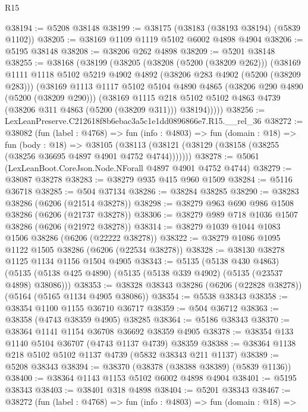 \begin{lexlean}{R15}
\begin{coremodule}
{{{{{{{{{{{@38194 := @5208 @38148
@38199 := @38175 (@38183 (@38193 @38194) (@5839 @1102))
@38205 := @38169 @1109 @1119 @5102 @6002 @4898 @4904
@38206 := @5195 @38148
@38208 := @38206 @262 @4898
@38209 := @5201 @38148
@38255 := @38168
    (@38199
      (@38205
        (@38208 (@5200 (@38209 @262)))
        (@38169
          @1111
          @1118
          @5102
          @5219
          @4902
          @4892
          (@38206 @283 @4902 (@5200 (@38209 @283)))
          (@38169
            @1113
            @1117
            @5102
            @5104
            @4890
            @4865
            (@38206 @290 @4890 (@5200 (@38209 @290)))
            (@38169
              @1115
              @218
              @5102
              @5102
              @4863
              @4739
              (@38206 @311 @4863 (@5200 (@38209 @311)))
              @38194)))))
@38256 := LexLeanPreserve.C212618f8b6ebac3a5c1e1dd0896866e7.R15.__rel_36
@38272 := @38082
    (fun (label : @4768) =>
    fun (info : @4803) =>
    fun (domain : @18) =>
    fun (body : @18) =>
    @38105 (@38113 (@38121 (@38129 (@38158 (@38255 (@38256 @36695 @4897 @4901 @4752 @4744)))))))
@38278 := @5061 (LexLeanBoot.CoreJson.Node.NForall @4897 @4901 @4752 @4744)
@38279 := @38087 @38278
@38283 := @38279 @935 @415 @960 @1509
@38284 := @5116 @36718
@38285 := @504 @37134
@38286 := @38284 @38285
@38290 := @38283 @38286 (@6206 (@21514 @38278))
@38298 := @38279 @963 @690 @986 @1508 @38286 (@6206 (@21737 @38278))
@38306 := @38279 @989 @718 @1036 @1507 @38286 (@6206 (@21972 @38278))
@38314 := @38279 @1039 @1044 @1083 @1506 @38286 (@6206 (@22222 @38278))
@38322 := @38279 @1086 @1095 @1122 @1505 @38286 (@6206 (@22534 @38278))
@38328 := @38130 @38278 @1125 @1134 @1156 @1504 @4905
@38343 := @5135
    (@5138 @430 @4863)
    (@5135 (@5138 @425 @4890) (@5135 (@5138 @339 @4902) (@5135 (@23537 @4898) @38086)))
@38353 := @38328 @38343 @38286 (@6206 (@22828 @38278)) (@5164 (@5165 @1134 @4905 @38086))
@38354 := @5538 @38343
@38358 := @38354 @1100 @1155 @36710 @36717
@38359 := @504 @36712
@38363 := @38358 (@4743 @38359 @4905) @38285
@38364 := @5186 @38343
@38370 := @38364 @1141 @1154 @36708 @36692 @38359 @4905
@38378 := @38354 @133 @1140 @5104 @36707 (@4743 @1137 @4739) @38359
@38388 := @38364 @1138 @218 @5102 @5102 @1137 @4739 (@5832 @38343 @211 @1137)
@38389 := @5208 @38343
@38394 := @38370 (@38378 (@38388 @38389) (@5839 @1136))
@38400 := @38364 @1143 @1153 @5102 @6002 @4898 @4904
@38401 := @5195 @38343
@38403 := @38401 @318 @4898
@38404 := @5201 @38343
@38467 := @38272
    (fun (label : @4768) =>
    fun (info : @4803) =>
    fun (domain : @18) =>
}}}}}}}}}}}
\end{coremodule}
\end{lexlean}
